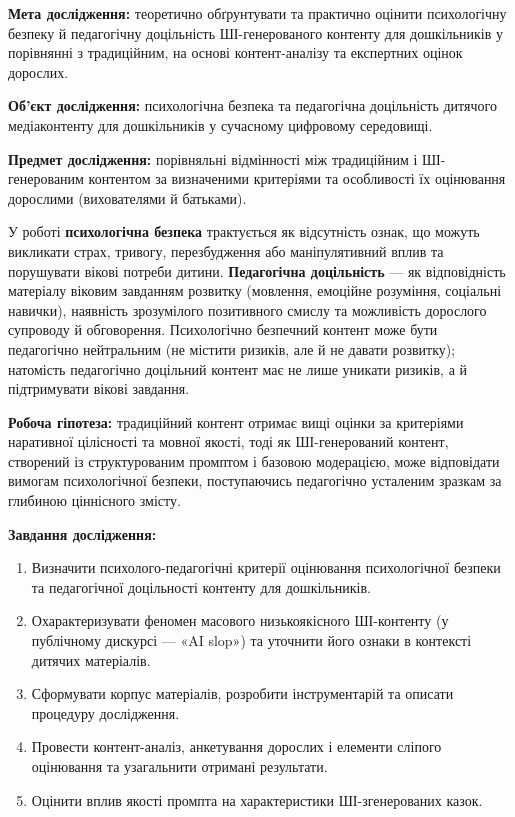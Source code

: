 \documentclass[14pt, a4paper]{extreport}
\begin{document}
\textbf{Мета дослідження:} теоретично обґрунтувати та практично оцінити психологічну безпеку й педагогічну доцільність ШІ-генерованого контенту для дошкільників у порівнянні з традиційним, на основі контент-аналізу та експертних оцінок дорослих.

\textbf{Об'єкт дослідження:} психологічна безпека та педагогічна доцільність дитячого медіаконтенту для дошкільників у сучасному цифровому середовищі.

\textbf{Предмет дослідження:} порівняльні відмінності між традиційним і ШІ-генерованим контентом за визначеними критеріями та особливості їх оцінювання дорослими (вихователями й батьками).

У роботі \textbf{психологічна безпека} трактується як відсутність ознак, що можуть викликати страх, тривогу, перезбудження або маніпулятивний вплив та порушувати вікові потреби дитини. \textbf{Педагогічна доцільність} --- як відповідність матеріалу віковим завданням розвитку (мовлення, емоційне розуміння, соціальні навички), наявність зрозумілого позитивного смислу та можливість дорослого супроводу й обговорення. Психологічно безпечний контент може бути педагогічно нейтральним (не містити ризиків, але й не давати розвитку); натомість педагогічно доцільний контент має не лише уникати ризиків, а й підтримувати вікові завдання.

\textbf{Робоча гіпотеза:} традиційний контент отримає вищі оцінки за критеріями наративної цілісності та мовної якості, тоді як ШІ-генерований контент, створений із структурованим промптом і базовою модерацією, може відповідати вимогам психологічної безпеки, поступаючись педагогічно усталеним зразкам за глибиною ціннісного змісту.

\textbf{Завдання дослідження:}
\begin{enumerate}
  \item Визначити психолого-педагогічні критерії оцінювання психологічної безпеки та педагогічної доцільності контенту для дошкільників.
  \item Охарактеризувати феномен масового низькоякісного ШІ-контенту (у публічному дискурсі --- «AI slop») та уточнити його ознаки в контексті дитячих матеріалів.
  \item Сформувати корпус матеріалів, розробити інструментарій та описати процедуру дослідження.
  \item Провести контент-аналіз, анкетування дорослих і елементи сліпого оцінювання та узагальнити отримані результати.
  \item Оцінити вплив якості промпта на характеристики ШІ-згенерованих казок.
\end{enumerate}
\end{document}

